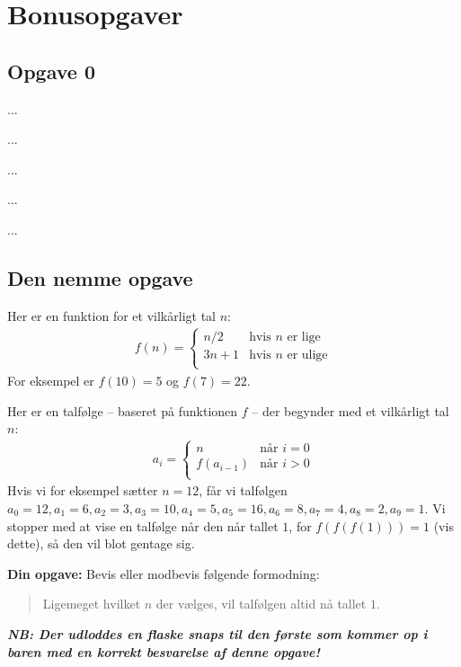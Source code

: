 \section{\huge{Bonusopgaver}}

\subsection{Opgave 0}

...

\newpage

...

\newpage

...

\newpage

...

\newpage

...

\subsection{Den nemme opgave}


Her er en funktion for et vilkårligt tal $n$:
\begin{align*}
f(n) = \begin{cases}
n/2 &\text{hvis }n\text{ er lige}\\
3n + 1 &\text{hvis }n\text{ er ulige}\\
\end{cases}
\end{align*}
For eksempel er $f(10) = 5$ og $f(7) = 22$.

Her er en talfølge -- baseret på funktionen $f$ -- der begynder med et
vilkårligt tal $n$:
\begin{align*}
a_i = \begin{cases}
n &\text{når }i = 0\\
f(a_{i - 1}) &\text{når }i > 0\\
\end{cases}
\end{align*}
Hvis vi for eksempel sætter $n = 12$, får vi talfølgen
$a_0 = 12, a_1 = 6, a_2 = 3, a_3 = 10, a_4 = 5, a_5 = 16, a_6 = 8, a_7 = 4, a_8
= 2, a_9 = 1$.  Vi stopper med at vise en talfølge når den når tallet $1$, for
$f(f(f(1))) = 1$ (vis dette), så den vil blot gentage sig.

\textbf{Din opgave:} Bevis eller modbevis følgende formodning:
\begin{quote}
Ligemeget hvilket $n$ der vælges, vil talfølgen altid nå tallet $1$.
\end{quote}

\textbf{\emph{NB: Der udloddes en flaske snaps til den første som kommer op i
baren med en korrekt besvarelse af denne opgave!}}
